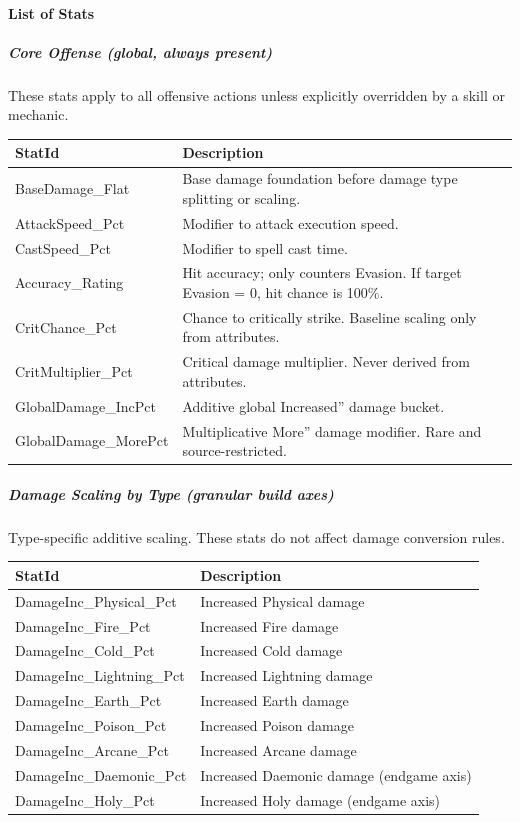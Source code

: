 \paragraph{List of Stats}

\subparagraph{Core Offense (global, always present)}

These stats apply to all offensive actions unless explicitly overridden by a skill or mechanic.

\begin{tabular}{l|p{10cm}}
	\textbf{StatId} & \textbf{Description} \\ \hline
	BaseDamage\_Flat & Base damage foundation before damage type splitting or scaling. \\
	AttackSpeed\_Pct & Modifier to attack execution speed. \\
	CastSpeed\_Pct & Modifier to spell cast time. \\
	Accuracy\_Rating & Hit accuracy; only counters Evasion. If target Evasion = 0, hit chance is 100\%. \\
	CritChance\_Pct & Chance to critically strike. Baseline scaling only from attributes. \\
	CritMultiplier\_Pct & Critical damage multiplier. Never derived from attributes. \\
	GlobalDamage\_IncPct & Additive global Increased'' damage bucket. \\ 
	GlobalDamage\_MorePct & Multiplicative More'' damage modifier. Rare and source-restricted. \\
\end{tabular}

\subparagraph{Damage Scaling by Type (granular build axes)}

Type-specific additive scaling. These stats do not affect damage conversion rules.

\begin{tabular}{l|l}
	\textbf{StatId} & \textbf{Description} \\ \hline
	DamageInc\_Physical\_Pct & Increased Physical damage \\
	DamageInc\_Fire\_Pct & Increased Fire damage \\
	DamageInc\_Cold\_Pct & Increased Cold damage \\
	DamageInc\_Lightning\_Pct & Increased Lightning damage \\
	DamageInc\_Earth\_Pct & Increased Earth damage \\
	DamageInc\_Poison\_Pct & Increased Poison damage \\
	DamageInc\_Arcane\_Pct & Increased Arcane damage \\
	DamageInc\_Daemonic\_Pct & Increased Daemonic damage (endgame axis) \\
	DamageInc\_Holy\_Pct & Increased Holy damage (endgame axis) \\
\end{tabular}

